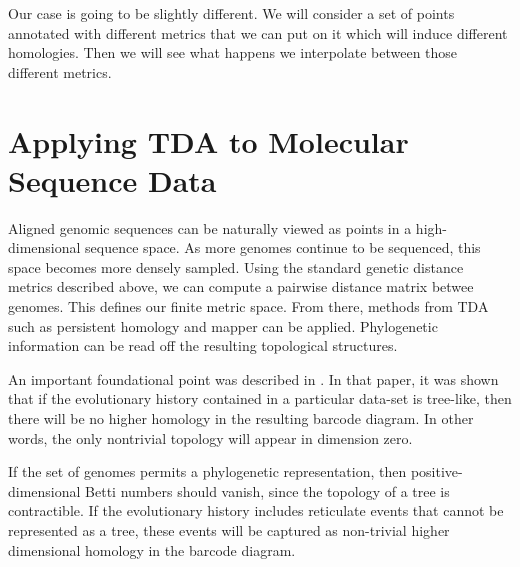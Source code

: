 Our case is going to be slightly different.
We will consider a set of points annotated with different metrics that we can put on it which will induce different homologies.
Then we will see what happens we interpolate between those different metrics.

\section{Applying TDA to Molecular Sequence Data}

Aligned genomic sequences can be naturally viewed as points in a high-dimensional sequence space.
As more genomes continue to be sequenced, this space becomes more densely sampled.
Using the standard genetic distance metrics described above, we can compute a pairwise distance matrix betwee genomes.
This defines our finite metric space.
From there, methods from TDA such as persistent homology and mapper can be applied.
Phylogenetic information can be read off the resulting topological structures.

An important foundational point was described in \cite{Chan:2013}.
In that paper, it was shown that if the evolutionary history contained in a particular data-set is tree-like, then there will be no higher homology in the resulting barcode diagram.
In other words, the only nontrivial topology will appear in dimension zero.

If the set of genomes permits a phylogenetic representation, then positive-dimensional Betti numbers should vanish, since the topology of a tree is contractible. 
If the evolutionary history includes reticulate events that cannot be represented as a tree, these events will be captured as non-trivial higher dimensional homology in the barcode diagram.

